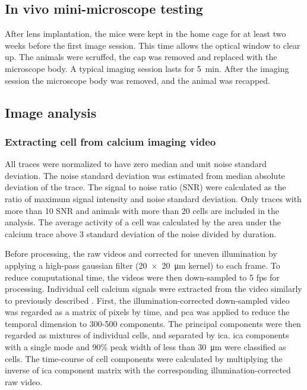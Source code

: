 \subsection{In vivo mini-microscope testing}
After lens implantation, the mice were kept in the home cage for at least two weeks before the first image session. This time allows the optical window to clear up. The animals were scruffed, the cap was removed and replaced with the microscope body. A typical imaging session lasts for \SI{5}{\minute}. After the imaging session the microscope body was removed, and the animal was recapped.

\subsection{Image analysis}

\subsubsection{Extracting cell from calcium imaging video}

All traces were normalized to have zero median and unit noise standard deviation. The noise standard deviation was estimated from median absolute deviation of the trace. The signal to noise ratio (SNR) were calculated as the ratio of maximum signal intensity and noise standard deviation. Only traces with more than 10 SNR and animals with more than 20 cells are included in the analysis. The average activity of a cell was calculated by the area under the calcium trace above 3 standard deviation of the noise divided by duration.

Before processing, the raw videos and corrected for uneven illumination by applying a high-pass gaussian filter (\SI{20 x 20}{\um} kernel) to each frame. To reduce computational time, the videos were then down-sampled to 5 fps for processing. Individual cell calcium signals were extracted from the video similarly to previously described \citep{mukamel09}. First, the illumination-corrected down-sampled video was regarded as a matrix of pixels by time, and \gls{pca} was applied to reduce the temporal dimension to 300-500 components. The principal components were then regarded as mixtures of individual cells, and separated by \gls{ica}. \Gls{ica} components with a single mode and 90\% peak width of less than \SI{30}{\um} were classified as cells. The time-course of cell components were calculated by multiplying the inverse of \gls{ica} component matrix with the corresponding illumination-corrected raw video.

